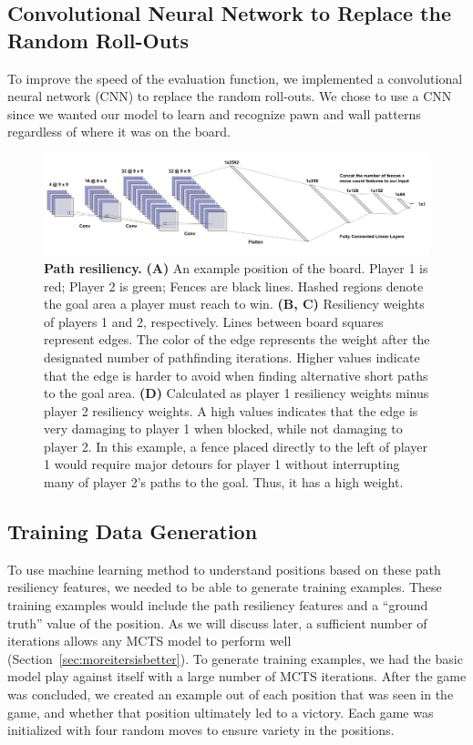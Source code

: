 \documentclass[10pt]{article}
\begin{document}
\subsection{Convolutional Neural Network to Replace the Random Roll-Outs}
To improve the speed of the evaluation function, we implemented a convolutional neural network (CNN) to replace the random roll-outs. We chose to use a CNN since we wanted our model to learn and recognize pawn and wall patterns regardless of where it was on the board. 
\begin{figure}[H]
    \centering
    \includegraphics[width=\linewidth]{cnn_arch.png}
    \caption{\textbf{Path resiliency.} \textbf{(A)} An example position of the board. Player 1 is red; Player 2 is green; Fences are black lines. Hashed regions denote the goal area a player must reach to win. \textbf{(B, C)} Resiliency weights of players 1 and 2, respectively. Lines between board squares represent edges. The color of the edge represents the weight after the designated number of pathfinding iterations. Higher values indicate that the edge is harder to avoid when finding alternative short paths to the goal area. \textbf{(D)} Calculated as player 1 resiliency weights minus player 2 resiliency weights. A high values indicates that the edge is very damaging to player 1 when blocked, while not damaging to player 2. In this example, a fence placed directly to the left of player 1 would require major detours for player 1 without interrupting many of player 2's paths to the goal. Thus, it has a high weight.}
    \label{fig:cnn_arch}
\end{figure}
\subsection{Training Data Generation}

To use machine learning method to understand positions based on these path resiliency features, we needed to be able to generate training examples. These training examples would include the path resiliency features and a ``ground truth'' value of the position. As we will discuss later, a sufficient number of iterations allows any MCTS model to perform well (Section~\ref{sec:moreitersisbetter}). To generate training examples, we had the basic model play against itself with a large number of MCTS iterations. After the game was concluded, we created an example out of each position that was seen in the game, and whether that position ultimately led to a victory. Each game was initialized with four random moves to ensure variety in the positions. 
\end{document}
